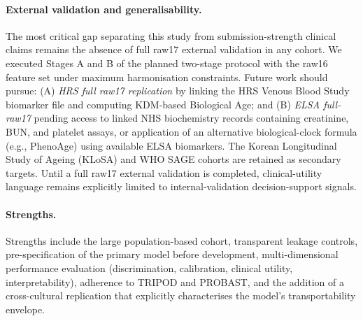 \documentclass[11pt,a4paper]{article}
\begin{document}
\paragraph{External validation and generalisability.}
The most critical gap separating this study from submission-strength clinical claims remains
the absence of full raw17 external validation in any cohort. We executed Stages A and B of the
planned two-stage protocol with the raw16 feature set under maximum harmonisation constraints.
Future work should pursue: (A) \emph{HRS full raw17 replication} by linking the HRS Venous Blood
Study biomarker file and computing KDM-based Biological Age; and (B) \emph{ELSA full-raw17}
pending access to linked NHS biochemistry records containing creatinine, BUN, and platelet
assays, or application of an alternative biological-clock formula (e.g., PhenoAge) using
available ELSA biomarkers. The Korean Longitudinal Study of Ageing (KLoSA) and WHO SAGE cohorts
are retained as secondary targets. Until a full raw17 external validation is completed,
clinical-utility language remains explicitly limited to internal-validation decision-support
signals.

\paragraph{Strengths.}
Strengths include the large population-based cohort, transparent leakage controls, pre-specification
of the primary model before development, multi-dimensional performance evaluation (discrimination,
calibration, clinical utility, interpretability), adherence to TRIPOD and PROBAST, and the addition
of a cross-cultural replication that explicitly characterises the model's transportability envelope.

\end{document}

